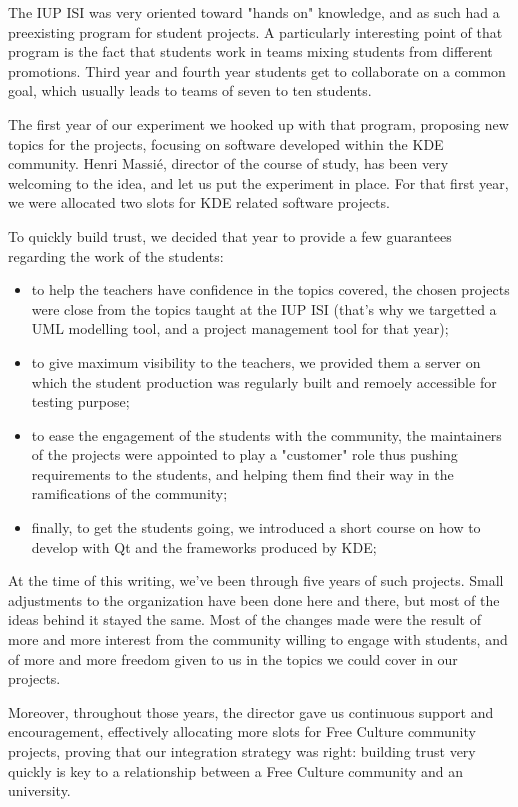 The IUP ISI was very oriented toward "hands on" knowledge, and as such had a preexisting program for student projects. A particularly interesting point of that program is the fact that students work in teams mixing students from different promotions. Third year and fourth year students get to collaborate on a common goal, which usually leads to teams of seven to ten students.

The first year of our experiment we hooked up with that program, proposing new topics for the projects, focusing on software developed within the KDE community. Henri Massié, director of the course of study, has been very welcoming to the idea, and let us put the experiment in place. For that first year, we were allocated two slots for KDE related software projects.

To quickly build trust, we decided that year to provide a few guarantees regarding the work of the students:
\begin{itemize}
  \item to help the teachers have confidence in the topics covered, the chosen projects were close from the topics taught at the IUP ISI (that's why we targetted a UML modelling tool, and a project management tool for that year);
  \item to give maximum visibility to the teachers, we provided them a server on which the student production was regularly built and remoely accessible for testing purpose;
  \item to ease the engagement of the students with the community, the maintainers of the projects were appointed to play a "customer" role thus pushing requirements to the students, and helping them find their way in the ramifications of the community;
  \item finally, to get the students going, we introduced a short course on how to develop with Qt and the frameworks produced by KDE;
\end{itemize}

At the time of this writing, we've been through five years of such projects. Small adjustments to the organization have been done here and there, but most of the ideas behind it stayed the same. Most of the changes made were the result of more and more interest from the community willing to engage with students, and of more and more freedom given to us in the topics we could cover in our projects.

Moreover, throughout those years, the director gave us continuous support and encouragement, effectively allocating more slots for Free Culture community projects, proving that our integration strategy was right: building trust very quickly is key to a relationship between a Free Culture community and an university.

